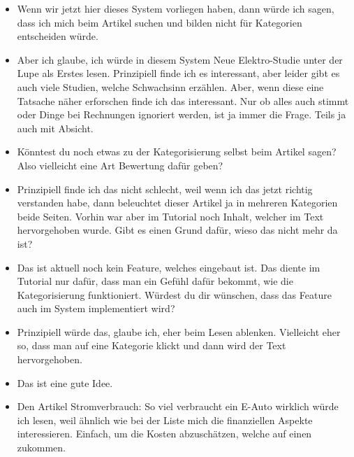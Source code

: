 {\begin{itemize}[]
                  Natürlich bin ich kein Fan davon, wenn mir nur Dreck vorgeschlagen wird.
                  Dann habe ich auch keinen Bock darauf.
                  Aber wenn es gut ist, also Dinge, welche zu mir passen würde ich so ein System bevorzugen.
            \item {} Wenn wir jetzt hier dieses System vorliegen haben, dann würde ich sagen, dass ich mich beim Artikel suchen und bilden nicht für Kategorien entscheiden würde.
            \item {} Aber ich glaube, ich würde in diesem System \flqq Neue Elektro-Studie unter der Lupe\frqq{} als Erstes lesen.
                  Prinzipiell finde ich es interessant, aber leider gibt es auch viele Studien, welche Schwachsinn erzählen.
                  Aber, wenn diese eine Tatsache näher erforschen finde ich das interessant.
                  Nur ob alles auch stimmt oder Dinge bei Rechnungen ignoriert werden, ist ja immer die Frage.
                  Teils ja auch mit Absicht.
            \item {} Könntest du noch etwas zu der Kategorisierung selbst beim Artikel sagen? Also vielleicht eine Art Bewertung dafür geben?
            \item {} Prinzipiell finde ich das nicht schlecht, weil wenn ich das jetzt richtig verstanden habe, dann beleuchtet dieser Artikel ja in mehreren Kategorien beide Seiten.
                  Vorhin war aber im Tutorial noch Inhalt, welcher im Text hervorgehoben wurde. Gibt es einen Grund dafür, wieso das nicht mehr da ist?
            \item {} Das ist aktuell noch kein Feature, welches eingebaut ist.
                  Das diente im Tutorial nur dafür, dass man ein Gefühl dafür bekommt, wie die Kategorisierung funktioniert.
                  Würdest du dir wünschen, dass das Feature auch im System implementiert wird?
            \item {} Prinzipiell würde das, glaube ich, eher beim Lesen ablenken.
                  Vielleicht eher so, dass man auf eine Kategorie klickt und dann wird der Text hervorgehoben.
            \item {} Das ist eine gute Idee.
            \item {} Den Artikel \flqq Stromverbrauch: So viel verbraucht ein E-Auto wirklich\frqq{} würde ich lesen, weil ähnlich wie bei der Liste mich die finanziellen Aspekte interessieren.
                  Einfach, um die Kosten abzuschätzen, welche auf einen zukommen.

\end{itemize}}
